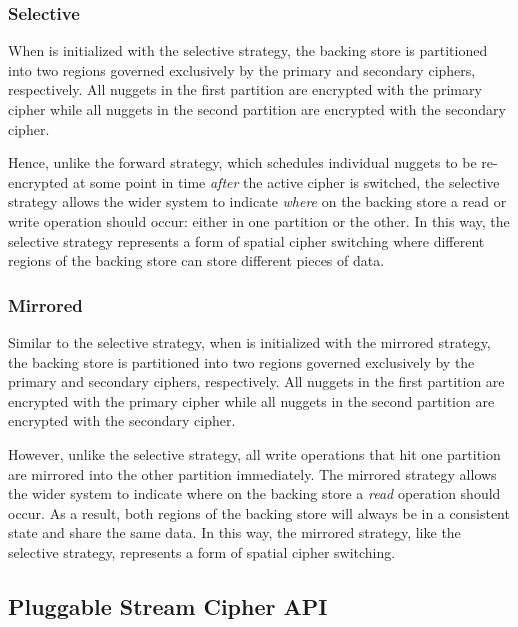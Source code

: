 {\subsubsection{Selective}

When \SYSTEM{} is initialized with the selective strategy, the backing store is
partitioned into two regions governed exclusively by the primary and secondary
ciphers, respectively. All nuggets in the first partition are encrypted with the
primary cipher while all nuggets in the second partition are encrypted with the
secondary cipher.

Hence, unlike the forward strategy, which schedules individual nuggets to be
re-encrypted at some point in time \emph{after} the active cipher is switched,
the selective strategy allows the wider system to indicate \emph{where} on the
backing store a read or write operation should occur: either in one partition or
the other. In this way, the selective strategy represents a form of spatial
cipher switching where different regions of the backing store can store
different pieces of data.

\subsubsection{Mirrored}

Similar to the selective strategy, when \SYSTEM{} is initialized with the
mirrored strategy, the backing store is partitioned into two regions governed
exclusively by the primary and secondary ciphers, respectively. All nuggets in
the first partition are encrypted with the primary cipher while all nuggets in
the second partition are encrypted with the secondary cipher.

However, unlike the selective strategy, all write operations that hit one
partition are mirrored into the other partition immediately. The mirrored
strategy allows the wider system to indicate where on the backing store a
\emph{read} operation should occur. As a result, both regions of the backing
store will always be in a consistent state and share the same data. In this way,
the mirrored strategy, like the selective strategy, represents a form of spatial
cipher switching.

\subsection{Pluggable Stream Cipher API}

}
